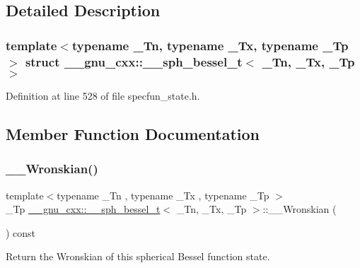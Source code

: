 \subsection{Detailed Description}
\subsubsection*{template$<$typename \+\_\+\+Tn, typename \+\_\+\+Tx, typename \+\_\+\+Tp$>$\newline
struct \+\_\+\+\_\+gnu\+\_\+cxx\+::\+\_\+\+\_\+sph\+\_\+bessel\+\_\+t$<$ \+\_\+\+Tn, \+\_\+\+Tx, \+\_\+\+Tp $>$}



Definition at line 528 of file specfun\+\_\+state.\+h.



\subsection{Member Function Documentation}
\mbox{\label{struct____gnu__cxx_1_1____sph__bessel__t_aefdc67ff4bd4b74bf6337c2a5724849b}} 
\subsubsection{\texorpdfstring{\+\_\+\+\_\+\+Wronskian()}{\_\_Wronskian()}}
{\footnotesize\ttfamily template$<$typename \+\_\+\+Tn , typename \+\_\+\+Tx , typename \+\_\+\+Tp $>$ \\
\+\_\+\+Tp \hyperlink{struct____gnu__cxx_1_1____sph__bessel__t}{\+\_\+\+\_\+gnu\+\_\+cxx\+::\+\_\+\+\_\+sph\+\_\+bessel\+\_\+t}$<$ \+\_\+\+Tn, \+\_\+\+Tx, \+\_\+\+Tp $>$\+::\+\_\+\+\_\+\+Wronskian (\begin{DoxyParamCaption}{ }\end{DoxyParamCaption}) const\hspace{0.3cm}{\ttfamily [inline]}}



Return the Wronskian of this spherical Bessel function state. 



